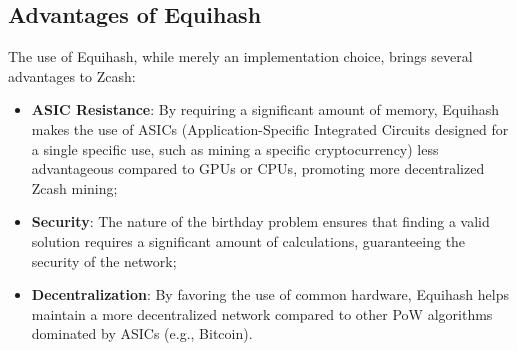 \subsection{Advantages of Equihash}

The use of Equihash, while merely an implementation choice, brings several advantages to Zcash:
\begin{itemize}
    \item \textbf{ASIC Resistance}: By requiring a significant amount of memory, Equihash makes the use of ASICs (Application-Specific Integrated Circuits designed for a single specific use, such as mining a specific cryptocurrency) less advantageous compared to GPUs or CPUs, promoting more decentralized Zcash mining;
    \item \textbf{Security}: The nature of the birthday problem ensures that finding a valid solution requires a significant amount of calculations, guaranteeing the security of the network;
    \item \textbf{Decentralization}: By favoring the use of common hardware, Equihash helps maintain a more decentralized network compared to other PoW algorithms dominated by ASICs (e.g., Bitcoin).
\end{itemize}